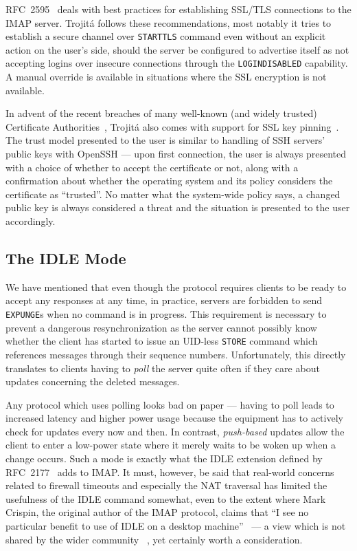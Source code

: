 \documentclass[trojita]{subfiles}
\begin{document}
RFC~2595~\cite{rfc2595} deals with best practices for establishing SSL/TLS connections to the IMAP server.  Trojitá
follows these recommendations, most notably it tries to establish a secure channel over {\tt STARTTLS} command even
without an explicit action on the user's side, should the server be configured to advertise itself as not accepting
logins over insecure connections through the {\tt LOGINDISABLED} capability.  A manual override is available in
situations where the SSL encryption is not available.

In advent of the recent breaches of many well-known (and widely trusted) Certificate Authorities~\cite{ssl-breaches},
Trojitá also comes with support for SSL key pinning~\cite{ssl-pinning}.  The trust model presented to the user is
similar to handling of SSH servers' public keys with OpenSSH --- upon first connection, the user is always presented with
a choice of whether to accept the certificate or not, along with a confirmation about whether the operating system and
its policy considers the certificate as ``trusted''.  No matter what the system-wide policy says, a changed public key
is always considered a threat and the situation is presented to the user accordingly.

\subsection{The IDLE Mode}
\label{sec:imap-idle}

We have mentioned that even though the protocol requires clients to be ready to accept any responses at any time, in
practice, servers are forbidden to send {\tt EXPUNGE}s when no command is in progress.  This requirement is necessary to
prevent a dangerous resynchronization as the server cannot possibly know whether the client has started to issue an
UID-less {\tt STORE} command which references messages through their sequence numbers.  Unfortunately, this directly
translates to clients having to {\em poll} the server quite often if they care about updates concerning the deleted
messages.

Any protocol which uses polling looks bad on paper --- having to poll leads to increased latency and higher power usage
because the equipment has to actively check for updates every now and then.  In contrast, {\em push-based} updates allow
the client to enter a low-power state where it merely waits to be woken up when a change occurs.  Such a mode is exactly
what the IDLE extension defined by RFC~2177~\cite{rfc2177} adds to IMAP.  It must, however, be said that real-world
concerns related to firewall timeouts and especially the NAT traversal has limited the usefulness of the IDLE command
somewhat, even to the extent where Mark Crispin, the original author of the IMAP protocol, claims that ``I see no
particular benefit to use of IDLE on a desktop machine''~\cite{crispin-idle-useless} --- a view which is not shared by
the wider community~\cite{tss-idle-keepalive} \cite{android-idle}, yet certainly worth a consideration.
\end{document}
